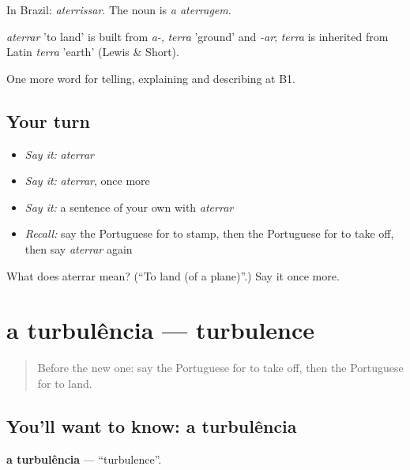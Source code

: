 In Brazil: \emph{aterrissar}. The noun is \emph{a aterragem}.

\begin{cousinweb}
\emph{aterrar} 'to land' is built from \emph{a-}, \emph{terra} 'ground' and \emph{-ar}; \emph{terra} is inherited from Latin \emph{terra} 'earth' (Lewis \& Short).
\end{cousinweb}

\begin{grammarlens}[title={What you've built}]
One more word for telling, explaining and describing at B1.
\end{grammarlens}

\subsection*{Your turn}
\begin{itemize}
\raggedright
  \item \emph{Say it:} \emph{aterrar}
  \item \emph{Say it:} \emph{aterrar}, once more
  \item \emph{Say it:} a sentence of your own with \emph{aterrar}
  \item \emph{Recall:} say the Portuguese for to stamp, then the Portuguese for to take off, then say \emph{aterrar} again
\end{itemize}

\begin{tcolorbox}[breakable,colback=teal!4,colframe=teal!35!black,title={Before you move on}]
What does aterrar mean? (\textquotedblleft{}To land (of a plane)\textquotedblright{}.) Say it once more.
\end{tcolorbox}
\section[a turbulência]{a turbulência — turbulence}

\label{lesson:PT-C424-turbulencia}



\begin{quote}
Before the new one: say the Portuguese for to take off, then the Portuguese for to land.
\end{quote}

\subsection*{You'll want to know: a turbulência}
\textbf{a turbulência} — \textquotedblleft{}turbulence\textquotedblright{}.

